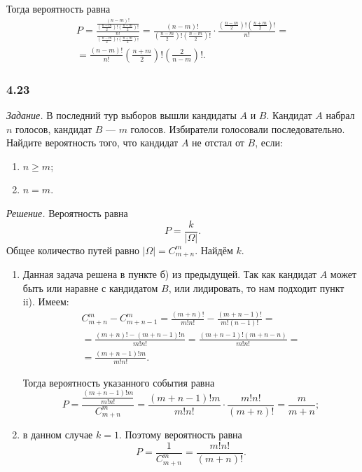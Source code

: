 \begin{enumerate}[label=\alph*)]
\begin{enumerate}[label=(\roman*)]
Тогда вероятность равна
\begin{equation*}
\begin{split}
P =
\frac{\frac{ \left( n-m \right)!}{ \left( \frac{n-m}{2} \right)! \left( \frac{n-m}{2} \right)! }}{\frac{n!}{ \left( \frac{n-m}{2} \right)! \left( \frac{n+m}{2} \right)!}} =
\frac{ \left( n-m \right)!}{ \left( \frac{n-m}{2} \right)! \left( \frac{n-m}{2} \right)! } \cdot
\frac{ \left( \frac{n-m}{2} \right)! \left( \frac{n+m}{2} \right)!}{n!} = \\
= \frac{ \left( n-m \right)!}{n!} \left( \frac{n+m}{2} \right)! \left( \frac{2}{n-m} \right)!.
\end{split}
\end{equation*}
\end{enumerate}
\end{enumerate}

\subsubsection*{4.23}

\textit{Задание.} В последний тур выборов вышли кандидаты $A$ и $B$.
Кандидат $A$ набрал $n$ голосов, кандидат $B$ --- $m$ голосов.
Избиратели голосовали последовательно.
Найдите вероятность того, что кандидат $A$ не отстал от $B$, если:
\begin{enumerate}[label=\alph*)]
\item $n \geq m$;
\item $n = m$.
\end{enumerate}
 
\textit{Решение.} Вероятность равна
$$P =
\frac{k}{| \Omega |}.$$
Общее количество путей равно $| \Omega| = C_{m+n}^m$.
Найдём $k$.

\begin{enumerate}[label=\alph*)]
\item Данная задача решена в пункте б) из предыдущей.
Так как кандидат $A$ может быть или наравне с кандидатом $B$, или лидировать, то нам подходит пункт ii).
Имеем:
\begin{equation*}
\begin{split}
C_{m+n}^m - C_{m+n-1}^m =
\frac{ \left( m+n \right)!}{m! n!} - \frac{ \left( m+n-1 \right)!}{m! \left( n-1 \right)!} = \\
= \frac{ \left( m+n \right)! - \left( m+n-1 \right)!n}{m!n!} =
\frac{ \left( m+n-1 \right)! \left( m+n-n \right) }{m!n!} = \\
= \frac{ \left( m+n-1 \right)! m}{m!n!}.
\end{split}
\end{equation*}

Тогда вероятность указанного события равна
$$P =
\frac{\frac{ \left( m+n-1 \right)! m}{m!n!}}{C_{m+n}^m} =
\frac{ \left( m+n-1 \right)! m}{m!n!} \cdot \frac{m!n!}{ \left( m+n \right)!} =
\frac{m}{m+n};$$

\item в данном случае $k = 1$.
Поэтому вероятность равна
$$P =
\frac{1}{C_{m+n}^m} =
\frac{m!n!}{ \left( m+n \right)!}.$$
\end{enumerate}

